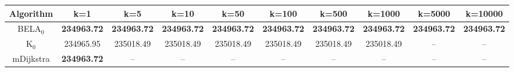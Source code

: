 \begin{tabular}{c|ccccccccc}\toprule
Algorithm & k=1 & k=5 & k=10 & k=50 & k=100 & k=500 & k=1000 & k=5000 & k=10000 \\ \midrule
BELA$_0$ & \textbf{234963.72} & \textbf{234963.72} & \textbf{234963.72} & \textbf{234963.72} & \textbf{234963.72} & \textbf{234963.72} & \textbf{234963.72} & \textbf{234963.72} & \textbf{234963.72} \\
K$_0$ & 234965.95 & 235018.49 & 235018.49 & 235018.49 & 235018.49 & 235018.49 & 235018.49 & -- & -- \\
mDijkstra & \textbf{234963.72} & -- & -- & -- & -- & -- & -- & -- & -- \\ \bottomrule 
\end{tabular}
